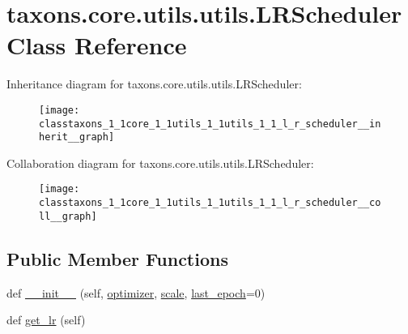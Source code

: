 \hypertarget{classtaxons_1_1core_1_1utils_1_1utils_1_1_l_r_scheduler}{}\section{taxons.\+core.\+utils.\+utils.\+L\+R\+Scheduler Class Reference}
\label{classtaxons_1_1core_1_1utils_1_1utils_1_1_l_r_scheduler}


Inheritance diagram for taxons.\+core.\+utils.\+utils.\+L\+R\+Scheduler\+:
\nopagebreak
\begin{figure}[H]
\begin{center}
\leavevmode
\texttt{[image: classtaxons\_1\_1core\_1\_1utils\_1\_1utils\_1\_1\_l\_r\_scheduler\_\_inherit\_\_graph]}
\end{center}
\end{figure}


Collaboration diagram for taxons.\+core.\+utils.\+utils.\+L\+R\+Scheduler\+:
\nopagebreak
\begin{figure}[H]
\begin{center}
\leavevmode
\texttt{[image: classtaxons\_1\_1core\_1\_1utils\_1\_1utils\_1\_1\_l\_r\_scheduler\_\_coll\_\_graph]}
\end{center}
\end{figure}
\subsection*{Public Member Functions}
\begin{DoxyCompactItemize}
\item 
def \hyperlink{classtaxons_1_1core_1_1utils_1_1utils_1_1_l_r_scheduler_a5505447dc98da502bdc66a80f733abac}{\+\_\+\+\_\+init\+\_\+\+\_\+} (self, \hyperlink{classtaxons_1_1core_1_1utils_1_1utils_1_1_l_r_scheduler_ad81deace999dc4abae71b745200a175b}{optimizer}, \hyperlink{classtaxons_1_1core_1_1utils_1_1utils_1_1_l_r_scheduler_aa169373cc2031ef4e786ad8cf490e283}{scale}, \hyperlink{classtaxons_1_1core_1_1utils_1_1utils_1_1_l_r_scheduler_ae1671c5050e76ef270a94c5cdabf583f}{last\+\_\+epoch}=0)
\item 
def \hyperlink{classtaxons_1_1core_1_1utils_1_1utils_1_1_l_r_scheduler_a8c2286ab23b1ac99ecaf66e29f42d5bd}{get\+\_\+lr} (self)
\end{DoxyCompactItemize}
